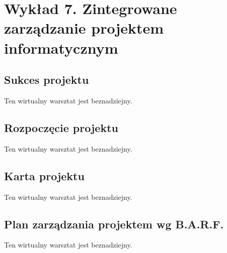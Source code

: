 \chapter{Wykład 7. Zintegrowane zarządzanie projektem informatycznym}

\section{Sukces projektu}

Ten wirtualny warsztat jest beznadziejny.


\section{Rozpoczęcie projektu}

Ten wirtualny warsztat jest beznadziejny.


\section{Karta projektu}

Ten wirtualny warsztat jest beznadziejny.


\section{Plan zarządzania projektem wg B.A.R.F.}

Ten wirtualny warsztat jest beznadziejny.


